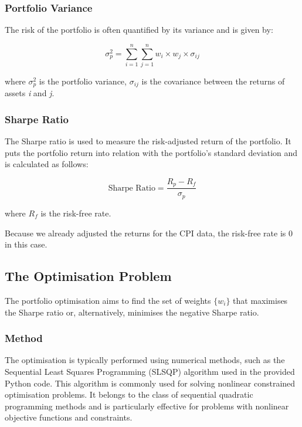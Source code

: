 \documentclass{article}
\begin{document}
\subsubsection*{Portfolio Variance}

The risk of the portfolio is often quantified by its variance and is given by:

\begin{equation}
\sigma_p^2 = \sum_{i=1}^{n} \sum_{j=1}^{n} w_i \times w_j \times \sigma_{ij}
\end{equation}

where \( \sigma_p^2 \) is the portfolio variance, \( \sigma_{ij} \) is the covariance between the returns of assets \textit{i} and \textit{j}.

\subsubsection*{Sharpe Ratio}

The Sharpe ratio is used to measure the risk-adjusted return of the portfolio. It puts the portfolio return into relation with the portfolio's standard deviation and is calculated as follows:

\begin{equation}
\text{Sharpe Ratio} = \frac{R_p - R_f}{\sigma_p}
\end{equation}

where \( R_f \) is the risk-free rate.

Because we already adjusted the returns for the CPI data, the risk-free rate is 0 in this case.

\subsection{The Optimisation Problem}

The portfolio optimisation aims to find the set of weights \( \{ w_i \} \) that maximises the Sharpe ratio or, alternatively, minimises the negative Sharpe ratio.

\subsubsection*{Method}

The optimisation is typically performed using numerical methods, such as the Sequential Least Squares Programming (SLSQP) algorithm used in the provided Python code. This algorithm is commonly used for solving nonlinear constrained optimisation problems. It belongs to the class of sequential quadratic programming methods and is particularly effective for problems with nonlinear objective functions and constraints.
\end{document}
